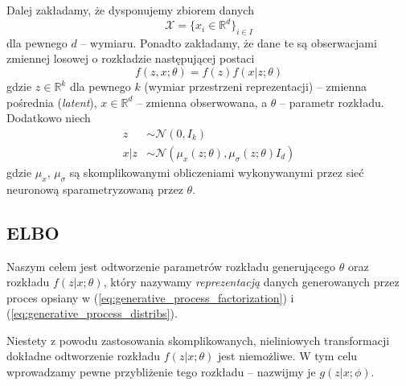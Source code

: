 \documentclass{iithesis}
\begin{document}
Dalej zakładamy, że dysponujemy zbiorem danych
$$
\mathcal{X} = \{x_i \in \mathbb{R}^{d}\}_{i \in I}
$$
dla pewnego $d$ -- wymiaru. Ponadto zakładamy, że dane te są obserwacjami
zmiennej losowej o rozkładzie następującej postaci
\begin{equation}
f(z, x; \theta) = f(z)f(x|z; \theta)
\label{eq:generative_process_factorization}
\end{equation}
gdzie $z \in \mathbb{R}^k$ dla pewnego $k$ (wymiar przestrzeni reprezentacji) -- zmienna pośrednia (\textit{latent}), $x \in \mathbb{R}^d$ -- zmienna obserwowana,
a $\theta$ -- parametr rozkładu. Dodatkowo niech
\begin{equation}
\begin{split}
z &\sim \mathcal{N}(0, I_k) \\
x|z &\sim \mathcal{N}(\mu_x(z; \theta), \mu_\sigma(z;\theta)I_d)
\end{split}
\label{eq:generative_process_distribs}
\end{equation}
gdzie $\mu_x,\,\mu_{\sigma}$ są skomplikowanymi obliczeniami
wykonywanymi przez sieć neuronową sparametryzowaną przez $\theta$.

\subsection{ELBO} \label{sec:elbo}
Naszym celem jest odtworzenie parametrów rozkładu generującego $\theta$
oraz rozkładu $f(z|x; \theta)$, który nazywamy \textit{reprezentacją} danych
generowanych przez proces opsiany w
(\ref{eq:generative_process_factorization}) i (\ref{eq:generative_process_distribs}).

Niestety z powodu zastosowania skomplikowanych, nieliniowych
transformacji dokładne odtworzenie rozkładu $f(z|x; \theta)$ jest niemożliwe.
W tym celu wprowadzamy pewne przybliżenie tego rozkładu -- nazwijmy je
$g(z|x; \phi)$.
\end{document}
